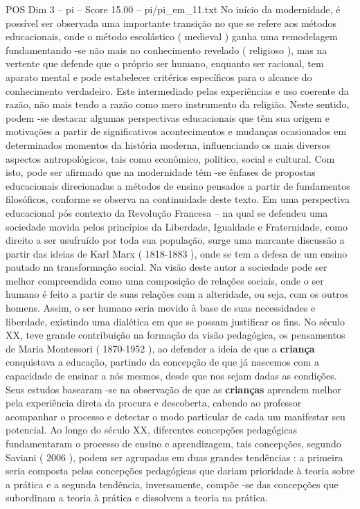 \begin{textsample}{POS Dim 3 – pi – Score 15.00 – pi/pi\_em\_11.txt}
No início da modernidade, é possível ser observada uma importante transição no que se refere aos métodos educacionais, onde o método escolástico ( medieval ) ganha uma remodelagem fundamentando -se não mais no conhecimento revelado ( religioso ), mas na vertente que defende que o próprio ser humano, enquanto ser racional, tem aparato mental e pode estabelecer critérios específicos para o alcance do conhecimento verdadeiro.
Este intermediado pelas experiências e uso coerente da razão, não mais tendo a razão como mero instrumento da religião.
Neste sentido, podem -se destacar algumas perspectivas educacionais que têm sua origem e motivações a partir de significativos acontecimentos e mudanças ocasionados em determinados momentos da história moderna, influenciando os mais diversos aspectos antropológicos, tais como econômico, político, social e cultural.
Com isto, pode ser afirmado que na modernidade têm -se ênfases de propostas educacionais direcionadas a métodos de ensino pensados a partir de fundamentos filosóficos, conforme se observa na continuidade deste texto.
Em uma perspectiva educacional pós contexto da Revolução Francesa – na qual se defendeu uma sociedade movida pelos princípios da Liberdade, Igualdade e Fraternidade, como direito a ser usufruído por toda sua população, surge uma marcante discussão a partir das ideias de Karl Marx ( 1818-1883 ), onde se tem a defesa de um ensino pautado na transformação social.
Na visão deste autor a sociedade pode ser melhor compreendida como uma composição de relações sociais, onde o ser humano é feito a partir de suas relações com a alteridade, ou seja, com os outros homens.
Assim, o ser humano seria movido à base de suas necessidades e liberdade, existindo uma dialética em que se possam justificar os fins.
No século XX, teve grande contribuição na formação da visão pedagógica, os pensamentos de Maria Montessori ( 1870-1952 ), ao defender a ideia de que a \textbf{criança} conquistava a educação, partindo da concepção de que já nascemos com a capacidade de ensinar a nós mesmos, desde que nos sejam dadas as condições.
Seus estudos basearam -se na observação de que as \textbf{crianças} aprendem melhor pela experiência direta da procura e descoberta, cabendo ao professor acompanhar o processo e detectar o modo particular de cada um manifestar seu potencial.
Ao longo do século XX, diferentes concepções pedagógicas fundamentaram o processo de ensino e aprendizagem, tais concepções, segundo Saviani ( 2006 ), podem ser agrupadas em duas grandes tendências : a primeira seria composta pelas concepções pedagógicas que dariam prioridade à teoria sobre a prática e a segunda tendência, inversamente, compõe -se das concepções que subordinam a teoria à prática e dissolvem a teoria na prática.

\end{textsample}
